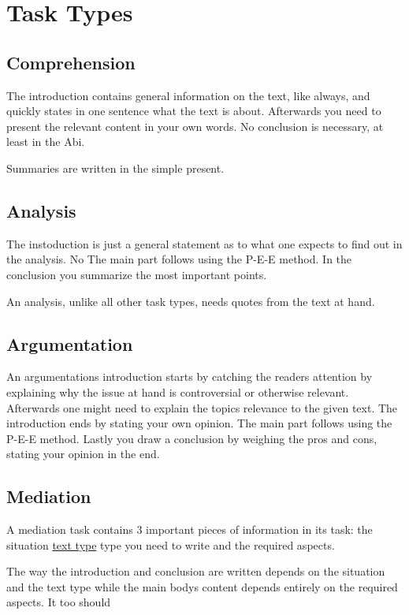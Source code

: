 \documentclass{article}
\begin{document}
\section{Task Types}
 
\subsection{Comprehension}
The introduction contains general information on the text, like always, and quickly states in one sentence what the text is about. \newline 
Afterwards you need to present the relevant content in your own words. \newline 
No conclusion is necessary, at least in the Abi. 
 
Summaries are written in the simple present. 
 
\subsection{Analysis} 
The instoduction is just a general statement as to what one expects to find out in the analysis. No  \newline 
The main part follows using the P-E-E method. \newline 
In the conclusion you summarize the most important points.
 
An analysis, unlike all other task types, needs quotes from the text at hand. 
 
\subsection{Argumentation}
An argumentations introduction starts by catching the readers attention by explaining why the issue at hand is controversial or otherwise relevant. Afterwards one might need to explain the topics relevance to the given text. The introduction ends by stating your own opinion. \newline 
The main part follows using the P-E-E method. \newline 
Lastly you draw a conclusion by weighing the pros and cons, stating your opinion in the end. 
 
\subsection{Mediation} 
A mediation task contains 3 important pieces of information in its task: the situation \hyperref[Text Type]{text type} type you need to write and the required aspects.
 
The way the introduction and conclusion are written depends on the situation and the text type while the main bodys content depends entirely on the required aspects. It too should 
\end{document}

